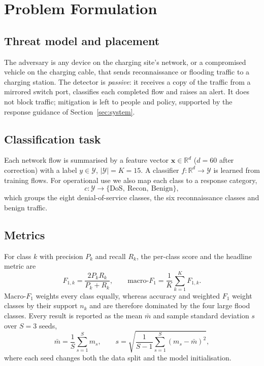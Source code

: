 \documentclass[conference]{IEEEtran}
\begin{document}
\section{Problem Formulation}
\label{sec:problem}

\subsection{Threat model and placement}

The adversary is any device on the charging site's network, or a compromised vehicle on the charging cable, that sends reconnaissance or flooding traffic to a charging station. The detector is \emph{passive}: it receives a copy of the traffic from a mirrored switch port, classifies each completed flow and raises an alert. It does not block traffic; mitigation is left to people and policy, supported by the response guidance of Section~\ref{sec:system}.

\subsection{Classification task}

Each network flow is summarised by a feature vector $\mathbf{x} \in \mathbb{R}^{d}$ ($d = 60$ after correction) with a label $y \in \mathcal{Y}$, $|\mathcal{Y}| = K = 15$. A classifier $f:\mathbb{R}^d \rightarrow \mathcal{Y}$ is learned from training flows. For operational use we also map each class to a response category,
\begin{equation}
c:\mathcal{Y}\rightarrow\{\text{DoS},\ \text{Recon},\ \text{Benign}\},
\label{eq:category}
\end{equation}
which groups the eight denial-of-service classes, the six reconnaissance classes and benign traffic.

\subsection{Metrics}

For class $k$ with precision $P_k$ and recall $R_k$, the per-class score and the headline metric are
\begin{equation}
F_{1,k} = \frac{2 P_k R_k}{P_k + R_k}, \qquad
\text{macro-}F_1 = \frac{1}{K} \sum_{k=1}^{K} F_{1,k}.
\label{eq:f1}
\end{equation}
Macro-$F_1$ weights every class equally, whereas accuracy and weighted $F_1$ weight classes by their support $n_k$ and are therefore dominated by the four large flood classes. Every result is reported as the mean $\bar{m}$ and sample standard deviation $s$ over $S = 3$ seeds,
\begin{equation}
\bar{m} = \frac{1}{S}\sum_{s=1}^{S} m_s, \qquad
s = \sqrt{\frac{1}{S-1}\sum_{s=1}^{S}\left(m_s - \bar{m}\right)^2 },
\label{eq:seeds}
\end{equation}
where each seed changes both the data split and the model initialisation.
\end{document}
